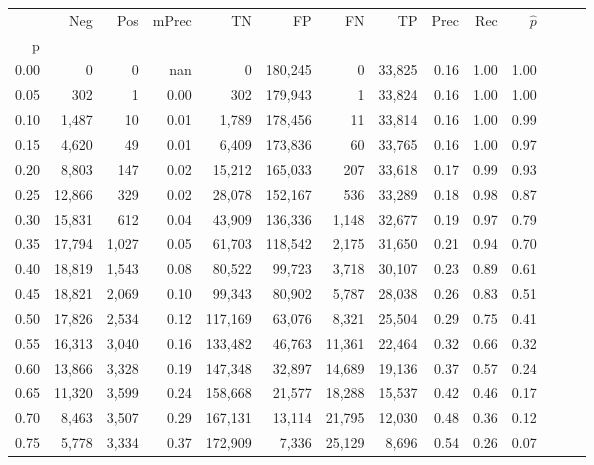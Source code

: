 \begin{tabular}{rrrrrrrrrrrrrr}
\toprule
{} &     Neg &    Pos & mPrec &       TN &       FP &      FN &      TP &  Prec &   Rec & $\hat{p}$ \\
p    &         &        &       &          &          &         &         &       &       &           \\
\midrule
0.00 &       0 &      0 &   nan &        0 &  180,245 &       0 &  33,825 &  0.16 &  1.00 &      1.00 \\
0.05 &     302 &      1 &  0.00 &      302 &  179,943 &       1 &  33,824 &  0.16 &  1.00 &      1.00 \\
0.10 &   1,487 &     10 &  0.01 &    1,789 &  178,456 &      11 &  33,814 &  0.16 &  1.00 &      0.99 \\
0.15 &   4,620 &     49 &  0.01 &    6,409 &  173,836 &      60 &  33,765 &  0.16 &  1.00 &      0.97 \\
0.20 &   8,803 &    147 &  0.02 &   15,212 &  165,033 &     207 &  33,618 &  0.17 &  0.99 &      0.93 \\
0.25 &  12,866 &    329 &  0.02 &   28,078 &  152,167 &     536 &  33,289 &  0.18 &  0.98 &      0.87 \\
0.30 &  15,831 &    612 &  0.04 &   43,909 &  136,336 &   1,148 &  32,677 &  0.19 &  0.97 &      0.79 \\
0.35 &  17,794 &  1,027 &  0.05 &   61,703 &  118,542 &   2,175 &  31,650 &  0.21 &  0.94 &      0.70 \\
0.40 &  18,819 &  1,543 &  0.08 &   80,522 &   99,723 &   3,718 &  30,107 &  0.23 &  0.89 &      0.61 \\
0.45 &  18,821 &  2,069 &  0.10 &   99,343 &   80,902 &   5,787 &  28,038 &  0.26 &  0.83 &      0.51 \\
0.50 &  17,826 &  2,534 &  0.12 &  117,169 &   63,076 &   8,321 &  25,504 &  0.29 &  0.75 &      0.41 \\
0.55 &  16,313 &  3,040 &  0.16 &  133,482 &   46,763 &  11,361 &  22,464 &  0.32 &  0.66 &      0.32 \\
0.60 &  13,866 &  3,328 &  0.19 &  147,348 &   32,897 &  14,689 &  19,136 &  0.37 &  0.57 &      0.24 \\
0.65 &  11,320 &  3,599 &  0.24 &  158,668 &   21,577 &  18,288 &  15,537 &  0.42 &  0.46 &      0.17 \\
0.70 &   8,463 &  3,507 &  0.29 &  167,131 &   13,114 &  21,795 &  12,030 &  0.48 &  0.36 &      0.12 \\
0.75 &   5,778 &  3,334 &  0.37 &  172,909 &    7,336 &  25,129 &   8,696 &  0.54 &  0.26 &      0.07 \\

\end{tabular}
